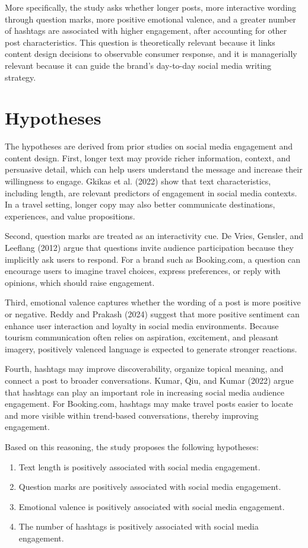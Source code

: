 \documentclass[12pt,a4paper]{ctexart}
\begin{document}
More specifically, the study asks whether longer posts, more interactive wording through question marks, more positive emotional valence, and a greater number of hashtags are associated with higher engagement, after accounting for other post characteristics. This question is theoretically relevant because it links content design decisions to observable consumer response, and it is managerially relevant because it can guide the brand's day-to-day social media writing strategy.

\section{Hypotheses}
The hypotheses are derived from prior studies on social media engagement and content design. First, longer text may provide richer information, context, and persuasive detail, which can help users understand the message and increase their willingness to engage. Gkikas et al. (2022) show that text characteristics, including length, are relevant predictors of engagement in social media contexts. In a travel setting, longer copy may also better communicate destinations, experiences, and value propositions.

Second, question marks are treated as an interactivity cue. De Vries, Gensler, and Leeflang (2012) argue that questions invite audience participation because they implicitly ask users to respond. For a brand such as Booking.com, a question can encourage users to imagine travel choices, express preferences, or reply with opinions, which should raise engagement.

Third, emotional valence captures whether the wording of a post is more positive or negative. Reddy and Prakash (2024) suggest that more positive sentiment can enhance user interaction and loyalty in social media environments. Because tourism communication often relies on aspiration, excitement, and pleasant imagery, positively valenced language is expected to generate stronger reactions.

Fourth, hashtags may improve discoverability, organize topical meaning, and connect a post to broader conversations. Kumar, Qiu, and Kumar (2022) argue that hashtags can play an important role in increasing social media audience engagement. For Booking.com, hashtags may make travel posts easier to locate and more visible within trend-based conversations, thereby improving engagement.

Based on this reasoning, the study proposes the following hypotheses:
\begin{enumerate}[label=H\arabic*.]
    \item Text length is positively associated with social media engagement.
    \item Question marks are positively associated with social media engagement.
    \item Emotional valence is positively associated with social media engagement.
    \item The number of hashtags is positively associated with social media engagement.
\end{enumerate}
\end{document}
